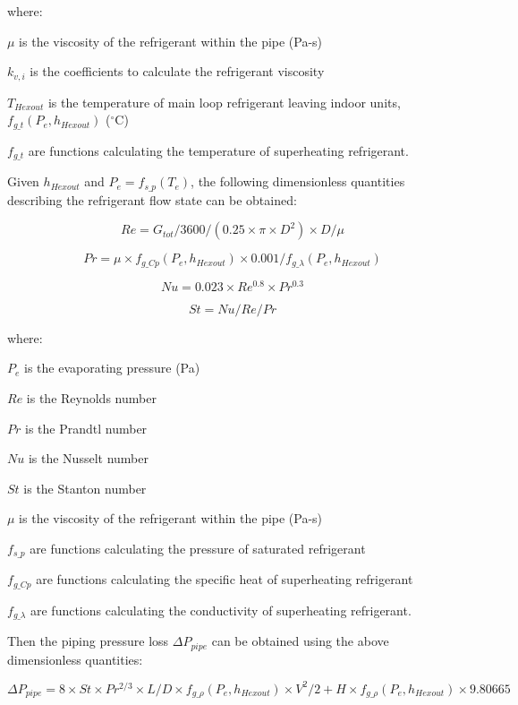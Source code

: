 where:

$\mu$ is the viscosity of the refrigerant within the pipe (Pa-s)

$k_{v,i}$ is the coefficients to calculate the refrigerant viscosity 

$T_{Hexout}$ is the temperature of main loop refrigerant leaving indoor units, $f_{g\_t}(P_e,h_{Hexout})$ (\(^{\circ}\)C)

$f_{g\_t}$ are functions calculating the temperature of superheating refrigerant.

Given $h_{Hexout}$ and $P_e=f_{s\_p}(T_e)$, the following dimensionless quantities describing the refrigerant flow state can be obtained:

\begin{equation}
  Re=G_{tot}/3600/(0.25\times\pi\times{D^2})\times{D}/\mu
\end{equation}

\begin{equation}
  Pr=\mu\times{f_{g\_Cp}(P_e,h_{Hexout})}\times{0.001}/f_{g\_\lambda}(P_e,h_{Hexout})
\end{equation}

\begin{equation}
  Nu=0.023\times{Re^{0.8}\times{Pr^{0.3}}}
\end{equation}

\begin{equation}
  St=Nu/Re/Pr
\end{equation}

where:

$P_e$ is the evaporating pressure (Pa) 

$Re$ is the Reynolds number 

$Pr$ is the Prandtl number 

$Nu$ is the Nusselt number 

$St$ is the Stanton number 

$\mu$ is the viscosity of the refrigerant within the pipe (Pa-s)

$f_{s\_p}$ are functions calculating the pressure of saturated refrigerant 

$f_{g\_Cp}$ are functions calculating the specific heat of superheating refrigerant 

$f_{g\_\lambda}$ are functions calculating the conductivity of superheating refrigerant.

Then the piping pressure loss $\Delta{P_{pipe}}$ can be obtained using the above dimensionless quantities:

\begin{equation}
  \Delta{P_{pipe}}=8\times{St}\times{Pr^{2/3}}\times{L/D}\times{f_{g\_\rho}(P_e,h_{Hexout})}\times{V^2}/2+H\times{f_{g\_\rho}(P_e,h_{Hexout})}\times9.80665
\end{equation}

